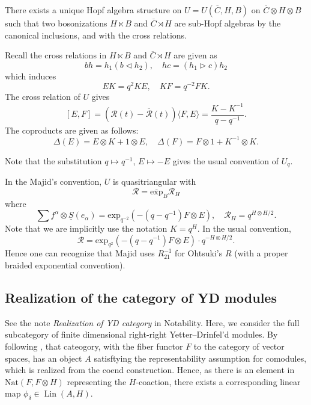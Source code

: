 \begin{theorem}
    There exists a unique Hopf algebra structure on $U = U(\overline{C}, H, B)$ on $\overline{C} \otimes H \otimes B$ such that two bosonizations $H \ltimes B$ and $\overline{C} \rtimes H$ are sub-Hopf algebras by the canonical inclusions, and with the cross relations.
\end{theorem}

Recall the cross relations in $H \ltimes B$ and $\overline{C} \rtimes H$ are given as
\[
    bh = h_1(b \triangleleft h_2), \quad hc = (h_1 \triangleright c)h_2
\]
which induces
\[
    EK = q^2 KE, \quad KF = q^{-2} FK.
\]
The cross relation of $U$ gives 
\[
[E, F] = (\mathscr{R}(t) - \overline{\mathscr{R}}(t))\langle F, E \rangle = \frac{K - K^{-1}}{q - q^{-1}}.
\]
The coproducts are given as follows:
\[
    \Delta(E) = E \otimes K + 1 \otimes E, \quad \Delta(F) = F \otimes 1 + K^{-1} \otimes K.
\]

Note that the substitution $q \mapsto q^{-1}$, $E \mapsto -E$ gives the usual convention of $U_q$.

In the Majid's convention, $U$ is quasitriangular with
\[
\mathscr{R} = \overline{\text{exp}}_B \mathscr{R}_H
\]
where
\[
    \sum f^\alpha \otimes \underline{S}(e_\alpha) = \mathrm{exp}_{q^{-2}}(-(q - q^{-1}) F \otimes E), \quad \mathscr{R}_H = q^{H \otimes H / 2}.
\]
Note that we are implicitly use the notation $K = q^H$.
In the usual convention,
\[
\mathscr{R} = \mathrm{exp}_{q^2}(-(q - q^{-1}) F \otimes E) \cdot q^{-H \otimes H/2}.
\]
Hence one can recognize that Majid uses $R_{21}^{-1}$ for Ohtsuki's $R$ (with a proper braided exponential convention).


\subsection*{Realization of the category of YD modules}

See the note \emph{Realization of YD category} in Notability.
Here, we consider the full subcategory of finite dimensional right-right Yetter--Drinfel'd modules.
By following \cite{Majid94}, that cateogory, with the fiber functor $F$ to the category of vector spaces, has an object $A$ satisftying the representability assumption for comodules, which is realized from the coend construction.
Hence, as there is an element in $\mathrm{Nat}(F, F \otimes H)$ representing the $H$-coaction, there exists a corresponding linear map $\phi_\delta \in \operatorname{Lin}(A, H)$.

